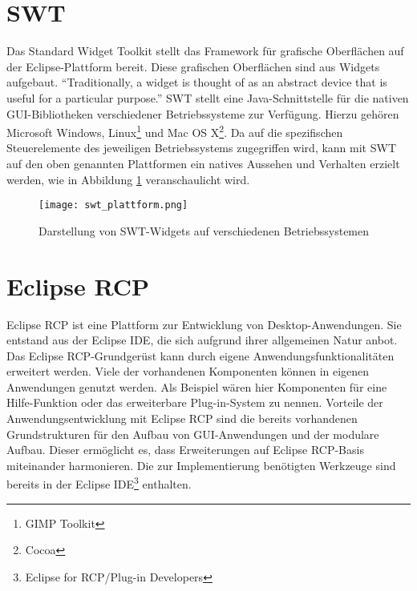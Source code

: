 \section{SWT}{
\label{sec:SWT}
Das Standard Widget Toolkit stellt das Framework für grafische Oberflächen auf der Eclipse-Plattform bereit. Diese grafischen Oberflächen sind aus Widgets aufgebaut. "`Traditionally, a widget is thought of as an abstract device that is useful for a particular purpose."'\cite[Kap.1]{SWT} \ac{SWT} stellt eine Java-Schnittstelle für die nativen GUI-Bibliotheken verschiedener Betriebssysteme zur Verfügung. Hierzu gehören Microsoft Windows, Linux\footnote{GIMP Toolkit} und Mac OS X\footnote{Cocoa}. Da auf die spezifischen Steuerelemente des jeweiligen Betriebssystems zugegriffen wird, kann mit \ac{SWT} auf den oben genannten Plattformen ein natives Aussehen und Verhalten erzielt werden, wie in Abbildung \ref{fig:swt_plattform} veranschaulicht wird.


\begin{figure}[htbp] 
  \centering
     \texttt{[image: swt\_plattform.png]}
  \caption{Darstellung von SWT-Widgets auf verschiedenen Betriebssystemen \protect  \cite{RalfEbert}}
   \label{fig:swt_plattform}
\end{figure}




}

\section{Eclipse RCP}{
\label{sec:Eclipse_rcp}
Eclipse \ac{RCP} ist eine Plattform zur Entwicklung von Desktop-Anwendungen. Sie entstand aus der Eclipse \ac{IDE}, die sich aufgrund ihrer allgemeinen Natur anbot. Das Eclipse \ac{RCP}-Grundgerüst kann durch eigene Anwendungsfunktionalitäten erweitert werden. Viele der vorhandenen Komponenten können in eigenen Anwendungen genutzt werden. Als Beispiel wären hier Komponenten für eine Hilfe-Funktion oder das erweiterbare Plug-in-System zu nennen. Vorteile der Anwendungsentwicklung mit Eclipse \ac{RCP} sind die bereits vorhandenen Grundstrukturen für den Aufbau von GUI-Anwendungen und der modulare Aufbau. Dieser ermöglicht es, dass Erweiterungen auf Eclipse \ac{RCP}-Basis miteinander harmonieren. Die zur Implementierung benötigten Werkzeuge sind bereits in der Eclipse \ac{IDE}\footnote{Eclipse for RCP/Plug-in Developers} enthalten.
}

